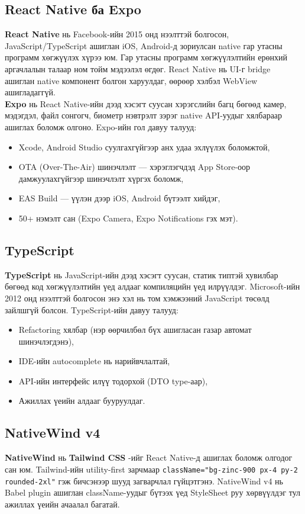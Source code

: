 \subsection{React Native ба Expo}
\textbf{React Native} \cite{reactnative} нь Facebook-ийн 2015 онд нээлттэй болгосон, JavaScript/TypeScript ашиглан iOS, Android-д зориулсан native гар утасны программ хөгжүүлэх хүрээ юм. Гар утасны программ хөгжүүлэлтийн ерөнхий аргачлалын талаар \cite{mn_mobiledev} ном тойм мэдээлэл өгдөг. React Native нь UI-г bridge ашиглан native компонент болгон харуулдаг, өөрөөр хэлбэл WebView ашигладаггүй.\\

\textbf{Expo} \cite{expo} нь React Native-ийн дээд хэсэгт суусан хэрэгслийн багц бөгөөд камер, мэдэгдэл, файл сонгогч, биометр нэвтрэлт зэрэг native API-уудыг хялбараар ашиглах боломж олгоно. Expo-ийн гол давуу талууд:
\begin{itemize}
    \item Xcode, Android Studio суулгахгүйгээр анх удаа эхлүүлэх боломжтой,
    \item OTA (Over-The-Air) шинэчлэлт --- хэрэглэгчдэд App Store-оор дамжуулахгүйгээр шинэчлэлт хүргэх боломж,
    \item EAS Build --- үүлэн дээр iOS, Android бүтээлт хийдэг,
    \item 50+ нэмэлт сан (Expo Camera, Expo Notifications гэх мэт).
\end{itemize}

\subsection{TypeScript}
\textbf{TypeScript} \cite{typescript} нь JavaScript-ийн дээд хэсэгт суусан, статик типтэй хувилбар бөгөөд код хөгжүүлэлтийн үед алдааг компиляцийн үед илрүүлдэг. Microsoft-ийн 2012 онд нээлттэй болгосон энэ хэл нь том хэмжээний JavaScript төсөлд зайлшгүй болсон. TypeScript-ийн давуу талууд:
\begin{itemize}
    \item Refactoring хялбар (нэр өөрчилбөл бүх ашигласан газар автомат шинэчлэгдэнэ),
    \item IDE-ийн autocomplete нь нарийвчлалтай,
    \item API-ийн интерфейс илүү тодорхой (DTO type-аар),
    \item Ажиллах үеийн алдааг бууруулдаг.
\end{itemize}

\subsection{NativeWind v4}
\textbf{NativeWind} \cite{nativewind} нь \textbf{Tailwind CSS} \cite{tailwind}-ийг React Native-д ашиглах боломж олгодог сан юм. Tailwind-ийн utility-first зарчмаар \texttt{className="bg-zinc-900 px-4 py-2 rounded-2xl"} гэж бичсэнээр шууд загварчлал гүйцэтгэнэ. NativeWind v4 нь Babel plugin ашиглан className-уудыг бүтээх үед StyleSheet руу хөрвүүлдэг тул ажиллах үеийн ачаалал багатай.\\

